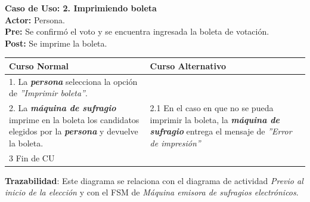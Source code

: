 \documentclass[spanish, 10pt,a4paper]{article}
\numberwithin{equation}{section} %
\begin{document}
\newpage
\noindent\textbf{Caso de Uso: 2. Imprimiendo boleta}\\
\textbf{Actor: } Persona.\\
\textbf{Pre: } Se confirmó el voto y se encuentra ingresada la boleta de votación.\\
\textbf{Post: } Se imprime la boleta.\\
\begin{table}[H]
  \centering
\bgroup
\def\arraystretch{1.3}
  \begin{tabular}{p{9cm} | p{7cm}}
    \hline
    Curso Normal & Curso Alternativo \\
    \hline
    \hline    
    1. La \textbf{\textit{persona}} selecciona la opción de \textit{''Imprimir boleta''}. 
    & \\
    
    \hline
    2. La \textbf{\textit{máquina de sufragio}} imprime en la boleta los candidatos elegidos por la \textbf{\textit{persona}} y devuelve la boleta.
    &
    2.1 En el caso en que no se pueda imprimir la boleta, la \textbf{\textit{máquina de sufragio}} entrega el mensaje de \textit{''Error de impresión''}
    \\
    
    \hline
    3 Fin de CU
    & \\
    \hline
  \end{tabular}
\egroup
\end{table}
\vspace{-10px}
\noindent\textbf{Trazabilidad}: Este diagrama se relaciona con el diagrama de actividad \textit{Previo al inicio de la elección} y con el FSM de \textit{Máquina emisora de sufragios electrónicos}.\\
\end{document}
